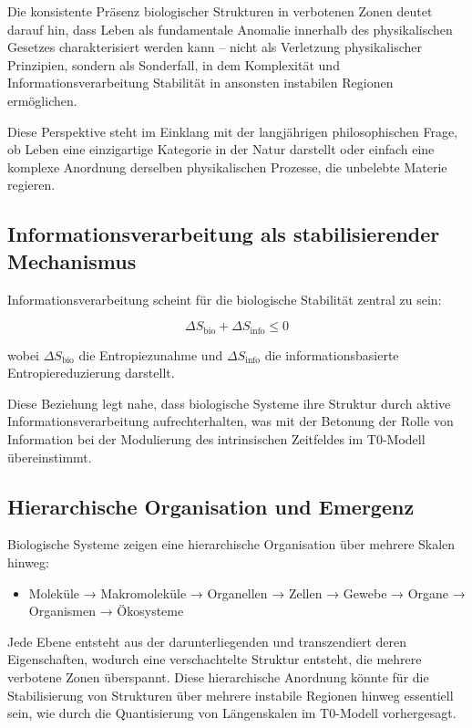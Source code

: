 \documentclass[12pt,a4paper]{article}
\begin{document}
	Die konsistente Präsenz biologischer Strukturen in verbotenen Zonen deutet darauf hin, dass Leben als fundamentale Anomalie innerhalb des physikalischen Gesetzes charakterisiert werden kann – nicht als Verletzung physikalischer Prinzipien, sondern als Sonderfall, in dem Komplexität und Informationsverarbeitung Stabilität in ansonsten instabilen Regionen ermöglichen.
	
	Diese Perspektive steht im Einklang mit der langjährigen philosophischen Frage, ob Leben eine einzigartige Kategorie in der Natur darstellt oder einfach eine komplexe Anordnung derselben physikalischen Prozesse, die unbelebte Materie regieren.
	
	\subsection{Informationsverarbeitung als stabilisierender Mechanismus}
	\label{subsec:information_stabilization}
	
	Informationsverarbeitung scheint für die biologische Stabilität zentral zu sein:
	
	\begin{equation}
		\Delta S_{\text{bio}} + \Delta S_{\text{info}} \leq 0
	\end{equation}
	
	wobei \(\Delta S_{\text{bio}}\) die Entropiezunahme und \(\Delta S_{\text{info}}\) die informationsbasierte Entropiereduzierung darstellt.
	
	Diese Beziehung legt nahe, dass biologische Systeme ihre Struktur durch aktive Informationsverarbeitung aufrechterhalten, was mit der Betonung der Rolle von Information bei der Modulierung des intrinsischen Zeitfeldes im T0-Modell übereinstimmt.
	
	\subsection{Hierarchische Organisation und Emergenz}
	\label{subsec:hierarchical_organization}
	
	Biologische Systeme zeigen eine hierarchische Organisation über mehrere Skalen hinweg:
	
	\begin{itemize}
		\item Moleküle → Makromoleküle → Organellen → Zellen → Gewebe → Organe → Organismen → Ökosysteme
	\end{itemize}
	
	Jede Ebene entsteht aus der darunterliegenden und transzendiert deren Eigenschaften, wodurch eine verschachtelte Struktur entsteht, die mehrere verbotene Zonen überspannt. Diese hierarchische Anordnung könnte für die Stabilisierung von Strukturen über mehrere instabile Regionen hinweg essentiell sein, wie durch die Quantisierung von Längenskalen im T0-Modell vorhergesagt.
	
\end{document}
